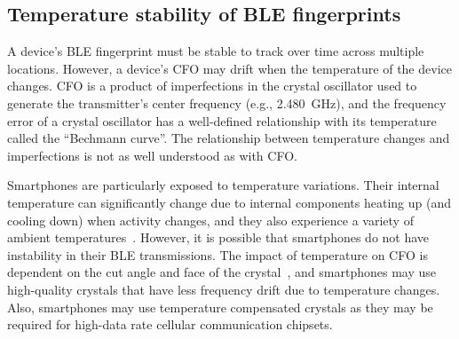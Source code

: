 

\subsection{Temperature stability of BLE fingerprints} %
\label{sec:challenges:temperature} A device's BLE fingerprint must be stable
to track over time across multiple locations.  However, a device's CFO
may drift when the temperature of the device changes.  CFO is a
product of imperfections in the crystal oscillator used to generate the
transmitter's center frequency (e.g., 2.480~GHz), and the frequency error of
a crystal oscillator has a well-defined relationship with its temperature
called the ``Bechmann curve''. The relationship between temperature changes
and \iq imperfections is not as well understood as with CFO.

Smartphones are particularly exposed to temperature variations. Their
internal temperature can significantly change due to internal components heating up (and cooling down) when activity changes, and
they also experience a variety of ambient temperatures~\cite{fireinyourhands}.
However, it is possible that smartphones 
do not have instability in their BLE transmissions. The impact of temperature
on CFO is dependent on the cut angle and face of the crystal~\cite{temp_cfo1},
and smartphones may use high-quality crystals that have less frequency drift due to temperature changes.
Also, smartphones may use temperature compensated
crystals as they may be required for high-data rate cellular communication chipsets.
 

